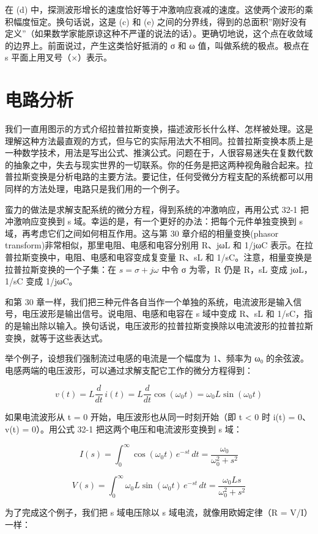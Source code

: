 在 (d)
中，探测波形增长的速度恰好等于冲激响应衰减的速度。这使两个波形的乘积幅度恒定。换句话说，这是
(c) 和 (e)
之间的分界线，得到的总面积''刚好没有定义''（如果数学家能原谅这种不严谨的说法的话）。更确切地说，这个点在收敛域的边界上。前面说过，产生这类恰好抵消的
σ 和 ω 值，叫做系统的极点。极点在 s 平面上用叉号（×）表示。

\section{电路分析}

我们一直用图示的方式介绍拉普拉斯变换，描述波形长什么样、怎样被处理。这是理解这种方法最直观的方式，但与它的实际用法大不相同。拉普拉斯变换本质上是一种数学技术，用法是写出公式、推演公式。问题在于，人很容易迷失在复数代数的抽象之中，失去与现实世界的一切联系。你的任务是把这两种视角融合起来。拉普拉斯变换是分析电路的主要方法。要记住，任何受微分方程支配的系统都可以用同样的方法处理，电路只是我们用的一个例子。

蛮力的做法是求解支配系统的微分方程，得到系统的冲激响应，再用公式 32-1
把冲激响应变换到 s 域。幸运的是，有一个更好的办法：把每个元件单独变换到
s 域，再考虑它们之间如何相互作用。这与第 30 章介绍的相量变换(phasor
transform)非常相似，那里电阻、电感和电容分别用 R、jωL 和 1/jωC
表示。在拉普拉斯变换中，电阻、电感和电容变成复变量 R、sL 和
1/sC。注意，相量变换是拉普拉斯变换的一个子集：在
\(s = \sigma + j\omega\) 中令 σ 为零，R 仍是 R，sL 变成 jωL，1/sC 变成
1/jωC。

和第 30
章一样，我们把三种元件各自当作一个单独的系统，电流波形是输入信号，电压波形是输出信号。说电阻、电感和电容在
s 域中变成 R、sL 和
1/sC，指的是输出除以输入。换句话说，电压波形的拉普拉斯变换除以电流波形的拉普拉斯变换，就等于这些表达式。

举个例子，设想我们强制流过电感的电流是一个幅度为 1、频率为 ω₀
的余弦波。电感两端的电压波形，可以通过求解支配它工作的微分方程得到：

\[v(t) = L\frac{d}{dt}\,i(t) = L\frac{d}{dt}\cos(\omega_0 t) = \omega_0 L \sin(\omega_0 t)\]

如果电流波形从 t = 0 开始，电压波形也从同一时刻开始（即 t \textless{} 0
时 i(t) = 0、v(t) = 0）。用公式 32-1 把这两个电压和电流波形变换到 s 域：

\[I(s) = \int_{0}^{\infty} \cos(\omega_0 t)\, e^{-st}\, dt = \frac{\omega_0}{\omega_0^2 + s^2}\]

\[V(s) = \int_{0}^{\infty} \omega_0 L \sin(\omega_0 t)\, e^{-st}\, dt = \frac{\omega_0 L s}{\omega_0^2 + s^2}\]

为了完成这个例子，我们把 s 域电压除以 s 域电流，就像用欧姆定律（R =
V/I）一样：


